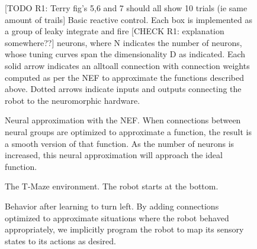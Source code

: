 \documentclass[conference]{IEEEtran}
\begin{document}
\begin{figure}[!t]
\centering
\caption{[TODO R1: Terry fig's 5,6 and 7 should all show 10 trials (ie same amount of trails] Basic reactive control. Each box is implemented as a group of leaky integrate and fire [CHECK R1: explanation somewhere??] neurons, where N indicates the number of neurons, whose tuning curves span the dimensionality D as indicated. Each solid arrow indicates an alltoall connection with connection weights computed as per the NEF to approximate the functions described above. Dotted arrows indicate inputs
and outputs connecting the robot to the neuromorphic hardware.}
\label{React}
\end{figure}

\begin{figure}[!t]
\centering
\caption{Neural approximation with the NEF. When connections between neural groups are optimized to approximate a function, the result is a smooth version of that function. As the number of neurons is increased, this neural approximation will approach the ideal function.}
\label{NEF}
\end{figure}


\begin{figure}[!t]
\centering
\caption{The T-Maze environment. The robot starts at the bottom.}
\label{Tmaze}
\end{figure}

\begin{figure}[!t]
\centering
\caption{Behavior after learning to turn left. By adding connections optimized to approximate situations where the robot behaved appropriately, we implicitly program the robot to map its sensory states to its actions as desired.}
\label{Left}
\end{figure}
\end{document}
